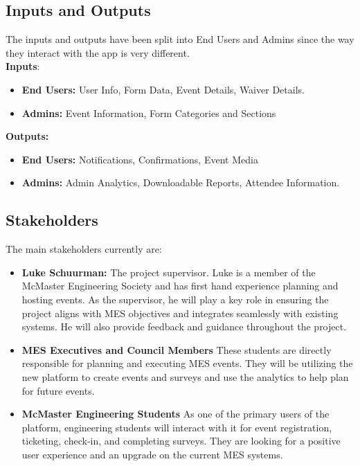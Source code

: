 \documentclass{article}
\begin{document}
\subsection{Inputs and Outputs}
The inputs and outputs have been split into End Users and Admins since the way they interact with the app is very different.\\
\textbf{Inputs}:
\begin{itemize}
    \item \textbf{End Users:} 
        User Info, Form Data, Event Details, Waiver Details.
    \item \textbf{Admins:} Event Information, Form Categories and Sections
\end{itemize} 
\textbf{Outputs:} 
\begin{itemize}
    \item \textbf{End Users:} Notifications, Confirmations, Event Media
    \item \textbf{Admins:} Admin Analytics, Downloadable Reports, Attendee Information.
\end{itemize}

\subsection{Stakeholders}
The main stakeholders currently are:
\begin{itemize}
    \item \textbf{Luke Schuurman:} The project supervisor.\newline
        Luke is a member of the McMaster Engineering Society and has first hand experience planning and hosting events. As the supervisor, he will play a key role in ensuring the project aligns with MES objectives and integrates seamlessly with existing systems. He will also provide feedback and guidance throughout the project.
    \item \textbf{MES Executives and Council Members}\newline
    These students are directly responsible for planning and executing MES events. They will be utilizing the new platform to create events and surveys and use the analytics to help plan for future events.
    \item \textbf{McMaster Engineering Students} \newline
    As one of the primary users of the platform, engineering students will interact with it for event registration, ticketing, check-in, and completing surveys. They are looking for a positive user experience and an upgrade on the current MES systems.
\end{itemize}
\end{document}
